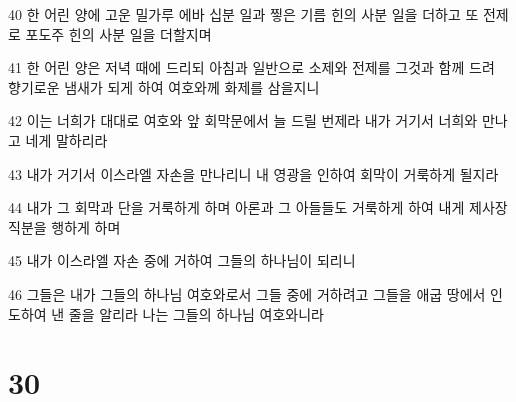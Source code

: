 \par 40 한 어린 양에 고운 밀가루 에바 십분 일과 찧은 기름 힌의 사분 일을 더하고 또 전제로 포도주 힌의 사분 일을 더할지며
\par 41 한 어린 양은 저녁 때에 드리되 아침과 일반으로 소제와 전제를 그것과 함께 드려 향기로운 냄새가 되게 하여 여호와께 화제를 삼을지니
\par 42 이는 너희가 대대로 여호와 앞 회막문에서 늘 드릴 번제라 내가 거기서 너희와 만나고 네게 말하리라
\par 43 내가 거기서 이스라엘 자손을 만나리니 내 영광을 인하여 회막이 거룩하게 될지라
\par 44 내가 그 회막과 단을 거룩하게 하며 아론과 그 아들들도 거룩하게 하여 내게 제사장 직분을 행하게 하며
\par 45 내가 이스라엘 자손 중에 거하여 그들의 하나님이 되리니
\par 46 그들은 내가 그들의 하나님 여호와로서 그들 중에 거하려고 그들을 애굽 땅에서 인도하여 낸 줄을 알리라 나는 그들의 하나님 여호와니라

\chapter{30}


